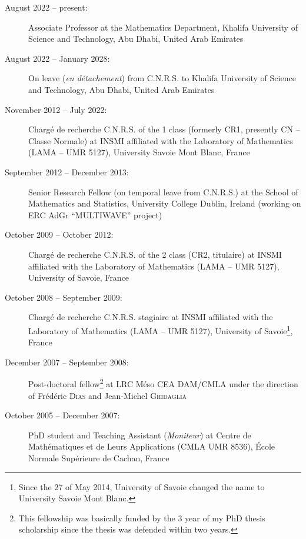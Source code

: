 \documentclass[final, a4paper, oneside, 12pt]{article}
\numberwithin{equation}{section}
\begin{document}
\begin{description}

  \item[August 2022 -- present:] Associate Professor at the Mathematics Department, Khalifa University of Science and Technology, Abu Dhabi, United Arab Emirates

  \item[August 2022 -- January 2028:] On leave (\textit{en d\'etachement}) from C.N.R.S. to Khalifa University of Science and Technology, Abu Dhabi, United Arab Emirates

  \item[November 2012 -- July 2022:] Charg\'e de recherche C.N.R.S. of the 1 class (formerly CR1, presently CN -- Classe Normale) at INSMI affiliated with the Laboratory of Mathematics (LAMA -- UMR 5127), University Savoie Mont Blanc, France

  
  \item[September 2012 -- December 2013:] Senior Research Fellow (on temporal leave from C.N.R.S.) at the School of Mathematics and Statistics, University College Dublin, Ireland (working on ERC AdGr ``MULTIWAVE'' project)
    
  \item[October 2009 -- October 2012:] Charg\'e de recherche C.N.R.S. of the 2 class (CR2, titulaire) at INSMI affiliated with the Laboratory of Mathematics (LAMA -- UMR 5127), University of Savoie, France
  
  \item[October 2008 -- September 2009:] Charg\'e de recherche C.N.R.S. stagiaire at INSMI affiliated with the Laboratory of Mathematics (LAMA -- UMR 5127), University of Savoie\footnote{Since the 27 of May 2014, University of Savoie changed the name to University Savoie Mont Blanc.\label{fn:usmb}}, France
  
  \item[December 2007 -- September 2008:] Post-doctoral fellow\footnote{This fellowship was basically funded by the 3 year of my PhD thesis scholarship since the thesis was defended within two years.} at LRC M\'eso CEA DAM/CMLA under the direction of Fr\'ed\'eric \textsc{Dias} and Jean-Michel \textsc{Ghidaglia}
  
  \item[October 2005 -- December 2007:] PhD student and Teaching Assistant (\emph{Moniteur}) at Centre de Math\'ematiques et de Leurs Applications (CMLA UMR 8536), \'Ecole Normale Sup\'erieure de Cachan, France
  
\end{description}
\end{document}

